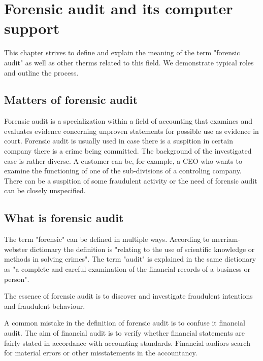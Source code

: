 \chapter{Forensic audit and its computer support}




This chapter strives to define and explain the meaning of the term "forensic audit" as well as other therms related to this field. We demonstrate typical roles and outline the process.

\section{Matters of forensic audit}
Forensic audit is a specialization within a field of accounting that examines and evaluates evidence concerning unproven statements for possible use as evidence in court. Forensic audit is usually used in case there is a suspition in certain company there is a crime being committed. The background of the investigated case is rather diverse. A customer can be, for example, a CEO  who wants to examine the functioning of one of the sub-divisions of a controling company. There can be a suspition of some fraudulent activity or the need of forensic audit can be closely unspecified.

\section{What is forensic audit}
The term "forensic" can be defined in multiple ways. According to merriam-webster dictionary  the definition is "relating to the use of scientific knowledge or methods in solving crimes". The term "audit" is explained in the same dictionary as "a complete and careful examination of the financial records of a business or person". 

The essence of forensic audit is to discover and investigate fraudulent intentions and fraudulent behaviour. 

A common mistake in the definition of forensic audit is to confuse it financial audit. The aim of financial audit is to verify whether financial statements are fairly stated in accordance with accounting standards. Financial audiors search for material errors or other misstatements in the accountancy.

